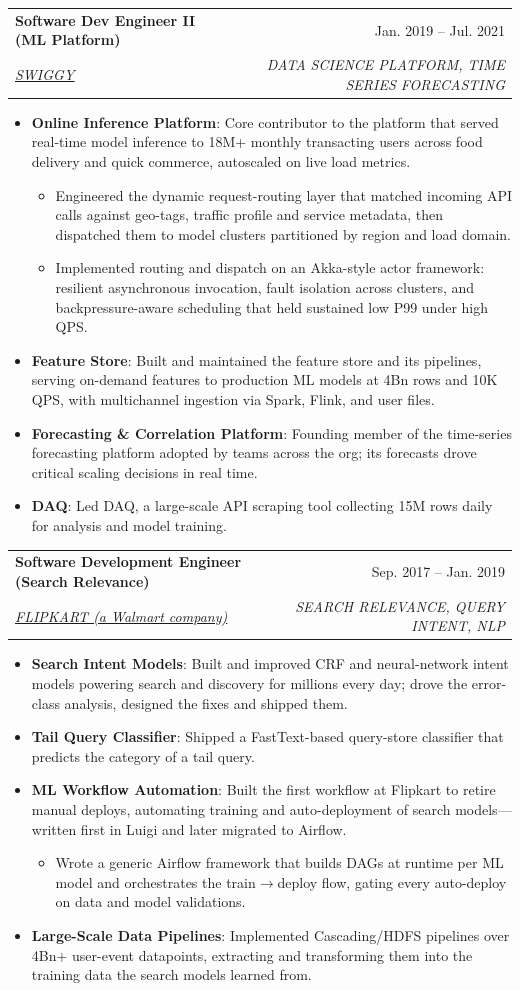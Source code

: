 \documentclass[letterpaper]{article}
\makeatletter
\newcommand{\resumeItem}[1]{%
  \item\small{\justifying #1}%
}
\newcommand{\resumeSubheading}[4]{%
  \item%
    \begin{tabular*}{0.97\textwidth}{@{}l@{\extracolsep{\fill}}r@{}}%
      \textbf{\textcolor{accentdark}{#1}} & #2 \\%
      \textit{\small#3} & \textit{\small #4} \\%
    \end{tabular*}%
}
\newcommand{\resumeTopic}[2]{%
  \item\small{\justifying \textbf{#1}: #2}%
}
\newcommand{\resumeItemListStart}{\begin{itemize}}
\newcommand{\resumeItemListEnd}{\end{itemize}}
\makeatother
\begin{document}
    \resumeSubheading
      {Software Dev Engineer II (ML Platform)}{Jan. 2019 -- Jul. 2021}
      {{\href{https://www.linkedin.com/company/swiggy-in/}{\textcolor{accentdark}{\underline{SWIGGY}}}}}{DATA SCIENCE PLATFORM, TIME SERIES FORECASTING}
      \resumeItemListStart
        \resumeTopic{Online Inference Platform}{Core contributor to the platform that served real-time model inference to 18M+ monthly transacting users across food delivery and quick commerce, autoscaled on live load metrics.}
          \resumeItemListStart
            \resumeItem{Engineered the dynamic request-routing layer that matched incoming API calls against geo-tags, traffic profile and service metadata, then dispatched them to model clusters partitioned by region and load domain.}
            \resumeItem{Implemented routing and dispatch on an Akka-style actor framework: resilient asynchronous invocation, fault isolation across clusters, and backpressure-aware scheduling that held sustained low P99 under high QPS.}
          \resumeItemListEnd
        \resumeTopic{Feature Store}{Built and maintained the feature store and its pipelines, serving on-demand features to production ML models at 4Bn rows and 10K QPS, with multichannel ingestion via Spark, Flink, and user files.}
        \resumeTopic{Forecasting \& Correlation Platform}{Founding member of the time-series forecasting platform adopted by teams across the org; its forecasts drove critical scaling decisions in real time.}
        \resumeTopic{DAQ}{Led DAQ, a large-scale API scraping tool collecting 15M rows daily for analysis and model training.}
      \resumeItemListEnd

    \resumeSubheading
      {Software Development Engineer (Search Relevance)}{Sep. 2017 -- Jan. 2019}
      {{\href{https://www.linkedin.com/company/flipkart/}{\textcolor{accentdark}{\underline{FLIPKART (a Walmart company)}}}}}{SEARCH RELEVANCE, QUERY INTENT, NLP}
      \resumeItemListStart
        \resumeTopic{Search Intent Models}{Built and improved CRF and neural-network intent models powering search and discovery for millions every day; drove the error-class analysis, designed the fixes and shipped them.}
        \resumeTopic{Tail Query Classifier}{Shipped a FastText-based query-store classifier that predicts the category of a tail query.}
        \resumeTopic{ML Workflow Automation}{Built the first workflow at Flipkart to retire manual deploys, automating training and auto-deployment of search models---written first in Luigi and later migrated to Airflow.}
          \resumeItemListStart
            \resumeItem{Wrote a generic Airflow framework that builds DAGs at runtime per ML model and orchestrates the train$\rightarrow$deploy flow, gating every auto-deploy on data and model validations.}
          \resumeItemListEnd
        \resumeTopic{Large-Scale Data Pipelines}{Implemented Cascading/HDFS pipelines over 4Bn+ user-event datapoints, extracting and transforming them into the training data the search models learned from.}
      \resumeItemListEnd
\end{document}
